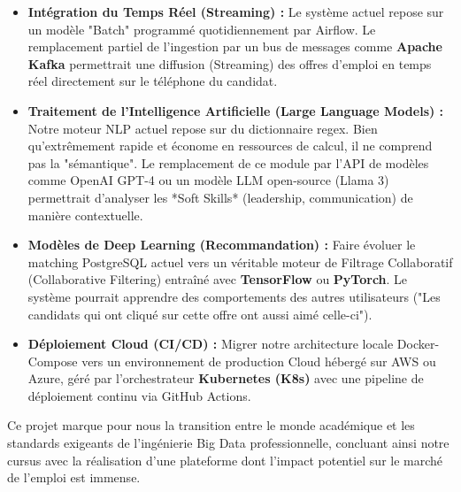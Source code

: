 \documentclass[12pt,a4paper,twoside]{report}
\begin{document}
\begin{itemize}
    \item \textbf{Intégration du Temps Réel (Streaming) :} Le système actuel repose sur un modèle "Batch" programmé quotidiennement par Airflow. Le remplacement partiel de l'ingestion par un bus de messages comme \textbf{Apache Kafka} permettrait une diffusion (Streaming) des offres d'emploi en temps réel directement sur le téléphone du candidat.
    \item \textbf{Traitement de l'Intelligence Artificielle (Large Language Models) :} Notre moteur NLP actuel repose sur du dictionnaire regex. Bien qu'extrêmement rapide et économe en ressources de calcul, il ne comprend pas la "sémantique". Le remplacement de ce module par l'API de modèles comme OpenAI GPT-4 ou un modèle LLM open-source (Llama 3) permettrait d'analyser les *Soft Skills* (leadership, communication) de manière contextuelle.
    \item \textbf{Modèles de Deep Learning (Recommandation) :} Faire évoluer le matching PostgreSQL actuel vers un véritable moteur de Filtrage Collaboratif (Collaborative Filtering) entraîné avec \textbf{TensorFlow} ou \textbf{PyTorch}. Le système pourrait apprendre des comportements des autres utilisateurs ("Les candidats qui ont cliqué sur cette offre ont aussi aimé celle-ci").
    \item \textbf{Déploiement Cloud (CI/CD) :} Migrer notre architecture locale Docker-Compose vers un environnement de production Cloud hébergé sur AWS ou Azure, géré par l'orchestrateur \textbf{Kubernetes (K8s)} avec une pipeline de déploiement continu via GitHub Actions.
\end{itemize}

Ce projet marque pour nous la transition entre le monde académique et les standards exigeants de l'ingénierie Big Data professionnelle, concluant ainsi notre cursus avec la réalisation d'une plateforme dont l'impact potentiel sur le marché de l'emploi est immense.
\end{document}
